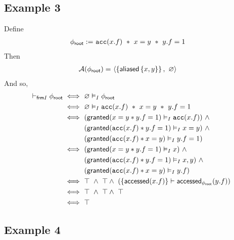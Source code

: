\newpage
\subsection*{Example 3}

Define
\begin{align*}
{\phi_\textsf{root}} := & \ \texttt{acc}(x.f) \ \ast \ x = y \ \ast \ y.f = 1
\end{align*}
Then
\begin{align*}
\mathcal{A}({\phi_\textsf{root}}) = & \ \langle  \left\{  \textsf{aliased}\left\{ x,y \right\} \right\}  ,\ \varnothing \rangle
\end{align*}
And so,
\begin{align*}
\vdash_{\textsf{frm}I} {\phi_\textsf{root}}
\iff & \
\varnothing \vDash_I {\phi_\textsf{root}}
\\ \iff & \
\varnothing \vDash_I \texttt{acc}(x.f) \ \ast \ x = y \ \ast \ y.f = 1
\\ \iff & \
( \textsf{granted}(x = y \ast y.f = 1) \vDash_I \texttt{acc}(x.f) ) \ \land \\ & \
( \textsf{granted}(\texttt{acc}(x.f) \ast y.f = 1) \vDash_I x = y ) \ \land \\ & \
( \textsf{granted}(\texttt{acc}(x.f) \ast x = y) \vDash_I y.f = 1 )
\\ \iff & \
( \textsf{granted}(x = y \ast y.f = 1) \vDash_I x ) \ \land \\ & \
( \textsf{granted}(\texttt{acc}(x.f) \ast y.f = 1) \vDash_I x, y ) \ \land \\ & \
( \textsf{granted}(\texttt{acc}(x.f) \ast x = y) \vDash_I y.f )
\\ \iff & \
\top \ \land \ \top \land \ ( \left\{  \textsf{accessed}(x.f)  \right\} \vdash \textsf{accessed}_{{\phi_\textsf{root}}}(y.f) )
\\ \iff & \
\top \ \land \ \top \land \ \top
\\ \iff & \
\top
\end{align*}

\newpage
\subsection*{Example 4}

